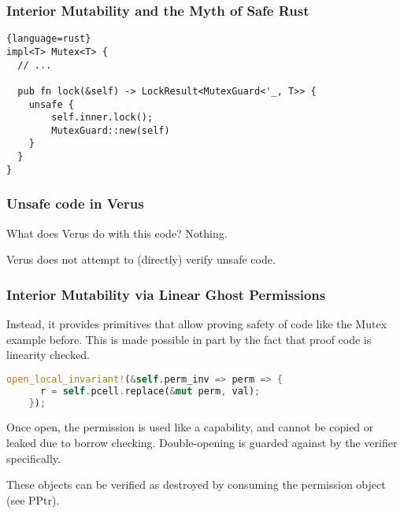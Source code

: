 \documentclass[
  aspectratio=1610, 
  xcolor={dvipsnames},
]{beamer}
\begin{document}

\begin{frame}[fragile]
  \frametitle{Interior Mutability and the Myth of Safe Rust}

  \begin{lstlisting}{language=rust}
impl<T> Mutex<T> {
  // ...

  pub fn lock(&self) -> LockResult<MutexGuard<'_, T>> {
    unsafe {
        self.inner.lock();
        MutexGuard::new(self)
    }
  }
}
  \end{lstlisting}

\end{frame}


\begin{frame}
  \frametitle{Unsafe code in Verus}

  What does Verus do with this code? \pause Nothing.

  \pause
  Verus does not attempt to (directly) verify unsafe code.

\end{frame}

\begin{frame}[fragile]
  \frametitle{Interior Mutability via Linear Ghost Permissions}

  Instead, it provides primitives that allow proving safety of code like the
  Mutex example before. \pause This is made possible in part by the fact that
  proof code is linearity checked.


  \begin{lstlisting}[language=rust]
    open_local_invariant!(&self.perm_inv => perm => {
      r = self.pcell.replace(&mut perm, val);
    });
  \end{lstlisting}

  \pause
  Once open, the permission is used like a capability, and cannot be copied or
  leaked due to borrow checking. Double-opening is guarded against by
  the verifier specifically.

  \pause
  These objects can be verified as destroyed by consuming the permission object
  (see PPtr).

\end{frame}
\end{document}

